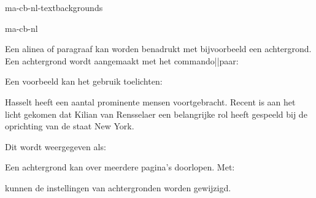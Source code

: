 \startonderdeel ma-cb-nl-textbackgrounds

\produkt ma-cb-nl




Een alinea of paragraaf kan worden benadrukt met bijvoorbeeld
een achtergrond. Een achtergrond wordt aangemaakt met het
commando||paar:


Een voorbeeld kan het gebruik toelichten:

\startbuffer
\stelachtergrondin[achtergrond=raster,hoek=rond]

\startachtergrond
Hasselt heeft een aantal prominente mensen voortgebracht.
Recent is aan het licht gekomen dat Kilian van Rensselaer
een belangrijke rol heeft gespeeld bij de oprichting van de
staat New York.
\stopachtergrond
\stopbuffer

\typebuffer

Dit wordt weergegeven als:

\haalbuffer

Een achtergrond kan over meerdere pagina's doorlopen. Met:


kunnen de instellingen van achtergronden worden gewijzigd.

\stoponderdeel
